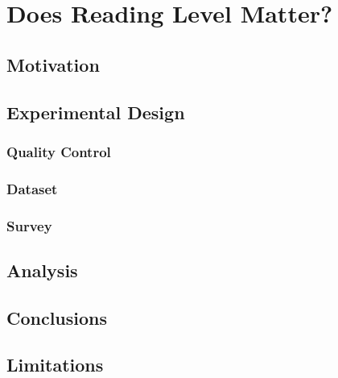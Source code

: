 \chapter{Does Reading Level Matter?}

\section{Motivation}
\section{Experimental Design}
\subsection{Quality Control}
\subsection{Dataset}
\subsection{Survey} 
\section{Analysis}
\section{Conclusions}
\section{Limitations}
